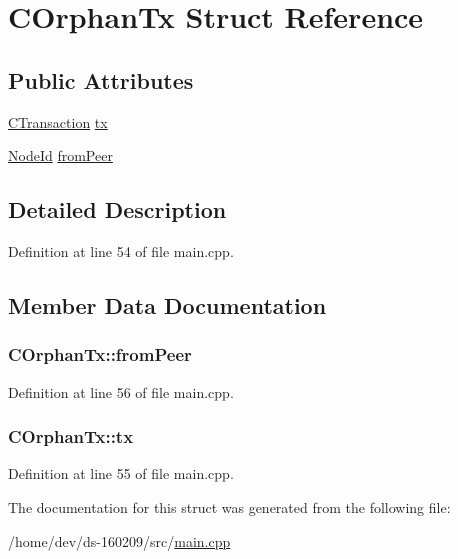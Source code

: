 \hypertarget{struct_c_orphan_tx}{}\section{C\+Orphan\+Tx Struct Reference}
\label{struct_c_orphan_tx}
\subsection*{Public Attributes}
\begin{DoxyCompactItemize}
\item 
\hyperlink{class_c_transaction}{C\+Transaction} \hyperlink{struct_c_orphan_tx_aa797568f3a1168e96d3c51601eda5fdc}{tx}
\item 
\hyperlink{net_8h_a954d746a58632565552615fd0a4ee660}{Node\+Id} \hyperlink{struct_c_orphan_tx_a06fa313a474fd4e6d0ed20bda7cbe69c}{from\+Peer}
\end{DoxyCompactItemize}


\subsection{Detailed Description}


Definition at line 54 of file main.\+cpp.



\subsection{Member Data Documentation}
\hypertarget{struct_c_orphan_tx_a06fa313a474fd4e6d0ed20bda7cbe69c}{}
\subsubsection[{from\+Peer}]{ C\+Orphan\+Tx\+::from\+Peer}\label{struct_c_orphan_tx_a06fa313a474fd4e6d0ed20bda7cbe69c}


Definition at line 56 of file main.\+cpp.

\hypertarget{struct_c_orphan_tx_aa797568f3a1168e96d3c51601eda5fdc}{}
\subsubsection[{tx}]{ C\+Orphan\+Tx\+::tx}\label{struct_c_orphan_tx_aa797568f3a1168e96d3c51601eda5fdc}


Definition at line 55 of file main.\+cpp.



The documentation for this struct was generated from the following file\+:\begin{DoxyCompactItemize}
\item 
/home/dev/ds-\/160209/src/\hyperlink{main_8cpp}{main.\+cpp}\end{DoxyCompactItemize}
